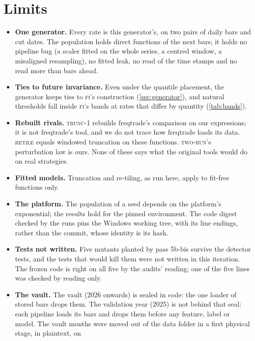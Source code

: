 \documentclass[11pt]{article}
\newcommand{\FI}{\textsc{fi}}
\newcommand{\TO}{\textsc{trunc-1}}
\newcommand{\RT}{\textsc{retile}}
\newcommand{\TR}{\textsc{two-run}}
\begin{document}
\section{Limits}\label{sec:limits}
\begin{itemize}[leftmargin=*]
\item \textbf{One generator.} Every rate is this generator's, on two pairs of daily bars and
  \NumCutDates{} cut dates. The population holds direct functions of the next bars; it holds no
  pipeline bug (a scaler fitted on the whole series, a centred window, a misaligned resampling), no
  fitted leak, no read of the time stamps and no read more than \NumReach{} bars ahead.
\item \textbf{Ties to future invariance.} Even under the quantile placement, the generator keeps ties to \FI's
  construction (\cref{sec:generator}), and natural thresholds fall inside \FI's bands at rates that
  differ by quantity (\cref{tab:bands}).
\item \textbf{Rebuilt rivals.} \TO{} rebuilds freqtrade's comparison on our expressions; it is not
  freqtrade's tool, and we do not trace how freqtrade loads its data. \RT{} equals windowed
  truncation on these functions. \TR's perturbation law is ours. None of these says what the
  original tools would do on real strategies.
\item \textbf{Fitted models.} Truncation and re-tiling, as run here, apply to fit-free functions
  only.
\item \textbf{The platform.} The population of a seed depends on the platform's exponential; the
  results hold for the pinned environment. The code digest checked by the runs pins the Windows
  working tree, with its line endings, rather than the commit, whose identity is its hash.
\item \textbf{Tests not written.} Five mutants planted by pass 5b-bis survive the detector tests,
  and the tests that would kill them were not written in this iteration. The frozen code is right
  on all five by the audits' reading; one of the five lines was checked by reading only.
\item \textbf{The vault.} The vault (2026 onwards) is sealed in code: the one loader of stored bars drops them. The
  validation year (2025) is not behind that seal: each pipeline loads its bars and drops them before
  any feature, label or model. The vault months were moved out of the data folder in a first physical stage, in plaintext, on

\end{itemize}
\end{document}
